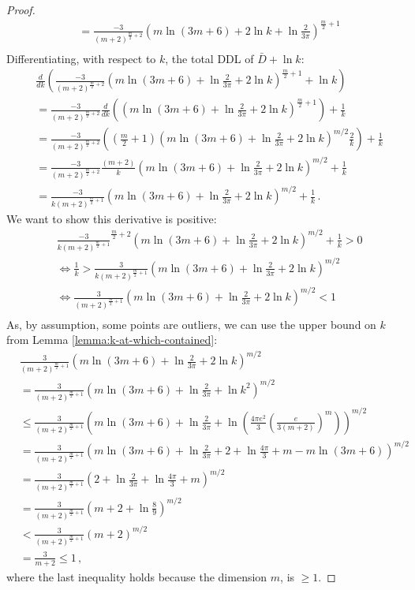 \begin{proof}
\begin{align*}
            &= \frac{-3}{(m+2)^{\frac{m}{2}+2}} \left(m\ln{(3m+6)} + 2 \ln{k} + \ln{\tfrac{2}{3\pi}} \right)^{\frac{m}{2}+1} \\
\end{align*}
Differentiating, with respect to $k$, the total DDL of $\bar{D} + \ln{k}$:
\begin{align*}
    &\frac{d}{dk}\left(\frac{-3}{(m+2)^{\frac{m}{2}+2}}(m \ln{(3m+6)}+\ln{\tfrac{2}{3\pi}}+2\ln{k})^{\frac{m}{2}+1} + \ln{k}\right) \\
    &=\frac{-3}{(m+2)^{\frac{m}{2}+2}}\frac{d}{dk}\left((m \ln{(3m+6)}+\ln{\tfrac{2}{3\pi}}+2\ln{k})^{\frac{m}{2}+1}\right) + \frac{1}{k} \\
    &=\frac{-3}{(m+2)^{\frac{m}{2}+2}}\left((\frac{m}{2}+1)(m \ln{(3m+6)}+\ln{\tfrac{2}{3\pi}}+2\ln{k})^{m/2}\frac{2}{k}\right) + \frac{1}{k} \\
    &=\frac{-3}{(m+2)^{\frac{m}{2}+2}}\frac{(m+2)}{k}\left(m \ln{(3m+6)}+\ln{\tfrac{2}{3\pi}}+2\ln{k}\right)^{m/2} + \frac{1}{k} \\
    &=\frac{-3}{k(m+2)^{\frac{m}{2}+1}}\left(m \ln{(3m+6)}+\ln{\tfrac{2}{3\pi}}+2\ln{k}\right)^{m/2} + \frac{1}{k} \,.
\end{align*}
We want to show this derivative is positive:
\begin{align*}
    &\frac{-3}{k(m+2)^{\frac{m}{2}+1}}^{\frac{m}{2}+2}\left(m \ln{(3m+6)}+\ln{\tfrac{2}{3\pi}}+2\ln{k}\right)^{m/2} + \frac{1}{k} > 0\\
    &\iff \frac{1}{k} > \frac{3}{k(m+2)^{\frac{m}{2}+1}}\left(m \ln{(3m+6)}+\ln{\tfrac{2}{3\pi}}+2\ln{k}\right)^{m/2}\\
    &\iff \frac{3}{(m+2)^{\frac{m}{2}+1}}\left(m \ln{(3m+6)}+\ln{\tfrac{2}{3\pi}}+2\ln{k}\right)^{m/2} < 1\\
\end{align*}
As, by assumption, some points are outliers, we can use the upper bound on $k$ from Lemma \ref{lemma:k-at-which-contained}:
\begin{align*}
    &\frac{3}{(m+2)^{\frac{m}{2}+1}}\left(m \ln{(3m+6)}+\ln{\tfrac{2}{3\pi}}+2\ln{k}\right)^{m/2} \\
    &= \frac{3}{(m+2)^{\frac{m}{2}+1}}\left(m \ln{(3m+6)}+\ln{\tfrac{2}{3\pi}}+\ln{k^2}\right)^{m/2} \\
    &\leq \frac{3}{(m+2)^{\frac{m}{2}+1}}\left(m \ln{(3m+6)}+\ln{\tfrac{2}{3\pi}}+\ln{\left(\frac{4\pi e^2}{3}\left(\frac{e}{3(m+2)}\right)^m\right)}\right)^{m/2} \\
    &= \frac{3}{(m+2)^{\frac{m}{2}+1}}\left(m \ln{(3m+6)} + \ln{\tfrac{2}{3\pi}} + 2 + \ln{\tfrac{4\pi}{3}} + m - m\ln{(3m+6)}\right)^{m/2} \\
    &= \frac{3}{(m+2)^{\frac{m}{2}+1}}\left(2 + \ln{\tfrac{2}{3\pi}} + \ln{\tfrac{4\pi}{3}} + m\right)^{m/2} \\
    &= \frac{3}{(m+2)^{\frac{m}{2}+1}}\left(m + 2 + \ln{\tfrac{8}{9}}\right)^{m/2} \\
    &< \frac{3}{(m+2)^{\frac{m}{2}+1}}(m + 2)^{m/2} \\
    &= \frac{3}{m+2} \leq 1 \,,
\end{align*}
where the last inequality holds because the dimension $m$, is $\geq 1$.
\end{proof}

